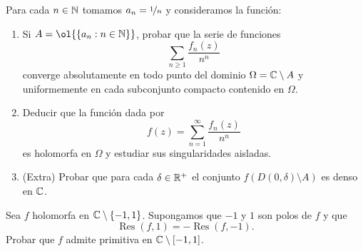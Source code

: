 \documentclass[12pt]{article}
\DeclareMathOperator{\Res}{Res}
\begin{document}
    \begin{ejercicio}[2.5 puntos]
        Para cada $n \in \mathbb{N}$ tomamos $a_n = \nicefrac{1}{n}$ y consideramos la función:
        \begin{enumerate}
            \item Si $A = \ol{\{a_n : n \in \bb{N}\}}$, probar que la serie de funciones
            \[
                \sum_{n \geq 1} \frac{f_n(z)}{n^n}
            \]
            converge absolutamente en todo punto del dominio $\Omega = \mathbb{C}\setminus A$ y uniformemente en cada subconjunto compacto contenido en $\Omega$.
            \item Deducir que la función dada por
            \[
                f(z) = \sum_{n=1}^{\infty} \frac{f_n(z)}{n^n}
            \]
            es holomorfa en $\Omega$ y estudiar sus singularidades aisladas.

            \item (Extra) Probar que para cada $\delta\in \mathbb{R}^+$ el conjunto $f\left(D(0,\delta)\setminus A\right)$ es denso en $\mathbb{C}$.
        \end{enumerate}
    \end{ejercicio}

    \begin{ejercicio}[2.5 puntos]
        Sea $f$ holomorfa en $\mathbb{C}\setminus\{-1, 1\}$. Supongamos que $-1$ y $1$ son polos de $f$ y que
        \[
            \Res(f, 1) = -\Res(f, -1).
        \]
        Probar que $f$ admite primitiva en $\mathbb{C} \setminus [-1, 1]$.
    \end{ejercicio}



    \newpage
    \setcounter{ejercicio}{0}
\end{document}
